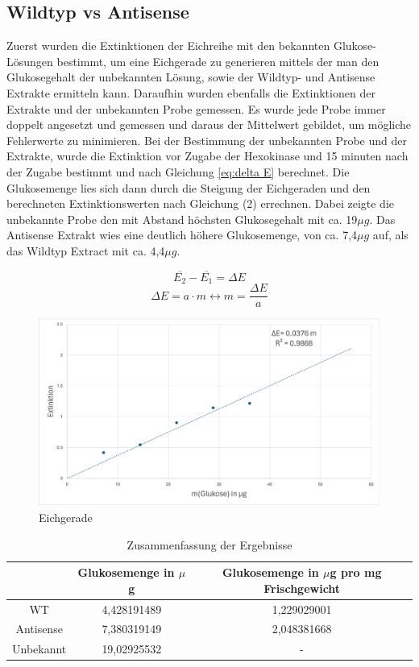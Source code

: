 \documentclass[10pt,a4paper]{article}
\begin{document}
	\subsection{Wildtyp vs Antisense}
		Zuerst wurden die Extinktionen der Eichreihe mit den bekannten  Glukose-Lösungen bestimmt, um eine Eichgerade zu generieren mittels der man den Glukosegehalt der unbekannten Lösung, sowie der Wildtyp- und Antisense Extrakte ermitteln kann. Daraufhin wurden ebenfalls die Extinktionen der Extrakte und der unbekannten Probe gemessen. Es wurde jede Probe immer doppelt angesetzt und gemessen und daraus der Mittelwert gebildet, um mögliche Fehlerwerte zu minimieren. Bei der Bestimmung der unbekannten Probe und der Extrakte, wurde die Extinktion vor Zugabe der Hexokinase und 15 minuten nach der Zugabe bestimmt und nach Gleichung \ref{eq:delta E} berechnet. Die Glukosemenge lies sich dann durch die Steigung der Eichgeraden und den berechneten Extinktionswerten nach Gleichung (2) errechnen. Dabei zeigte die unbekannte Probe den mit Abstand höchsten Glukosegehalt mit ca. 19$\mu g$. Das Antisense Extrakt wies eine deutlich höhere Glukosemenge, von ca. 7,4$\mu g$ auf, als das Wildtyp Extract mit ca. 4,4$\mu g$. 
		
		
		\begin{equation}\label{eq:delta E}
			\overline{E_2} - \overline{E_1}=\Delta E
		\end{equation}
		\begin{equation}\label{eq: eichkurve}
			\Delta E = a \cdot m \leftrightarrow m=\frac{\Delta E}{a}
		\end{equation}
		\begin{figure}[H]
			\centering
			\includegraphics[width=0.75\linewidth]{Eichgerade.png}
			\caption{Eichgerade}
			\label{Abbildung 1}
		\end{figure}
		
		\begin{table}[H]
			\centering
			\begin{tabular}{c|c|c}
				& Glukosemenge in $\mu$g & Glukosemenge in $\mu$g pro mg Frischgewicht\\ 
				\hline
				WT & 4,428191489 & 1,229029001\\
				\hline
				Antisense & 7,380319149 & 2,048381668\\
				\hline
				Unbekannt & 19,02925532 & -\\
			\end{tabular}
			\caption{Zusammenfassung der Ergebnisse}
			\label{tab:my_label}
		\end{table}
	
\end{document}
